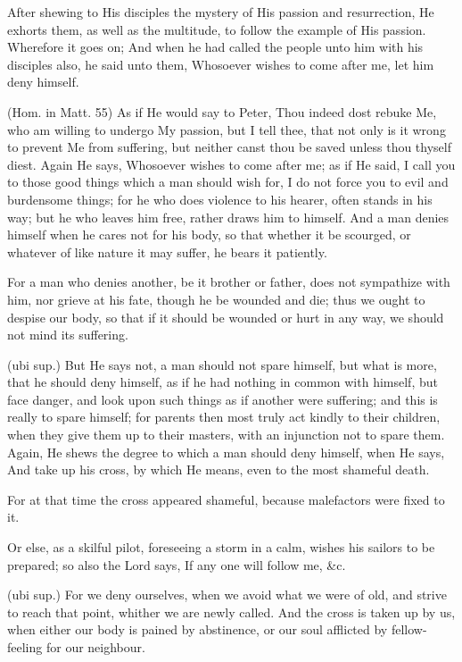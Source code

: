  After shewing to His disciples the mystery of His passion and resurrection, He exhorts them, as well as the multitude, to follow the example of His passion. Wherefore it goes on; And when he had called the people unto him with his disciples also, he said unto them, Whosoever wishes to come after me, let him deny himself.

 (Hom. in Matt. 55) As if He would say to Peter, Thou indeed dost rebuke Me, who am willing to undergo My passion, but I tell thee, that not only is it wrong to prevent Me from suffering, but neither canst thou be saved unless thou thyself diest. Again He says, Whosoever wishes to come after me; as if He said, I call you to those good things which a man should wish for, I do not force you to evil and burdensome things; for he who does violence to his hearer, often stands in his way; but he who leaves him free, rather draws him to himself. And a man denies himself when he cares not for his body, so that whether it be scourged, or whatever of like nature it may suffer, he bears it patiently.

 For a man who denies another, be it brother or father, does not sympathize with him, nor grieve at his fate, though he be wounded and die; thus we ought to despise our body, so that if it should be wounded or hurt in any way, we should not mind its suffering.

 (ubi sup.) But He says not, a man should not spare himself, but what is more, that he should deny himself, as if he had nothing in common with himself, but face danger, and look upon such things as if another were suffering; and this is really to spare himself; for parents then most truly act kindly to their children, when they give them up to their masters, with an injunction not to spare them. Again, He shews the degree to which a man should deny himself, when He says, And take up his cross, by which He means, even to the most shameful death.

 For at that time the cross appeared shameful, because malefactors were fixed to it.

 Or else, as a skilful pilot, foreseeing a storm in a calm, wishes his sailors to be prepared; so also the Lord says, If any one will follow me, \&c.

 (ubi sup.) For we deny ourselves, when we avoid what we were of old, and strive to reach that point, whither we are newly called. And the cross is taken up by us, when either our body is pained by abstinence, or our soul afflicted by fellow-feeling for our neighbour.

